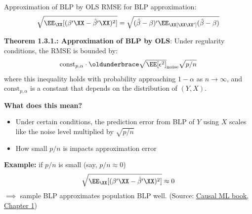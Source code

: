 \documentclass[compress, 8pt]{beamer}
\begin{document}
\begin{frame}{Approximation of BLP by OLS}
    RMSE for BLP approximation:
    \begin{equation*}
        \sqrt{\EE_\XX [(\beta^\prime \XX - \hat{\beta}^\prime \XX)^2]} = 
        \sqrt{(\hat{\beta} - \beta)^\prime \EE_\XX [\XX \XX^\prime] (\hat{\beta} - \beta)}
    \end{equation*}

    \textbf{Theorem 1.3.1.: Approximation of BLP by OLS}: Under regularity conditions, the RMSE is bounded by:
    \begin{equation*}
        \text{const}_{p, \alpha} 
        \cdot \underbrace{\sqrt{\EE [\epsilon^2]}}_{\text{noise}}
        \sqrt{p/n}
    \end{equation*}
    where this inequality holds with probability approaching $1 - \alpha$ as $n \to \infty$, and $ \text{const}_{p, \alpha}$ is a constant that depends on the distribution of $(Y, X)$. 
    
    \pause
    \vspace{2ex}    
    \textbf{What does this mean?}
    \begin{itemize}
        \item Under certain conditions, the prediction error from BLP of $Y$ using $X$ scales like the noise level multiplied by $\sqrt{p/n}$
        \item [$\implies$] How small $p/n$ is impacts approximation error
    \end{itemize}

    \vspace{2ex}
    \textbf{Example:} if $p/n$ is small (say, $p/n \approx 0$)
    \begin{equation*}
        \sqrt{\EE_\XX [(\beta^\prime \XX - \hat{\beta}^\prime \XX)^2]} \approx 0
    \end{equation*}
    $\implies$ sample BLP approximates population BLP well. 
    (Source: \href{https://causalml-book.org/chapters/CausalML_chap_1.pdf}{Causal ML book, Chapter 1})

\end{frame}
\end{document}
